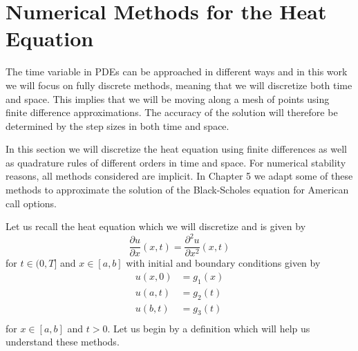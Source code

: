\documentclass[00main.tex]{subfiles}
\begin{document}

\chapter{Numerical Methods for the Heat Equation}


The time variable in PDEs can be approached in different ways and in this work we will focus on fully discrete methods, meaning that we will discretize both time and space. This implies that we will be moving along a mesh of points using finite difference approximations. The accuracy of the solution will therefore be determined by the step sizes in both time and space.


In this section we will discretize the heat equation using finite differences as well as quadrature rules of different orders in time and space. For numerical stability reasons, all methods considered are implicit. In Chapter 5 we adapt some of these methods to approximate the solution of the Black-Scholes equation for American call options.

Let us recall the heat equation which we will discretize and is given by \begin{equation}
\frac{\partial u}{\partial x} (x,t) = \frac{\partial^2 u}{\partial x^2} (x,t) \label{heat3}
\end{equation} for $t \in (0,T]$ and $x\in [a,b]$ with initial and boundary conditions given by \begin{align*}
u(x,0) &= g_1(x)\\
u(a,t) &= g_2(t)\\
u(b,t) &= g_3(t)\\
\end{align*} for $x\in [a,b]$ and $t >0$. Let us begin by a definition which will help us understand these methods.
\end{document}
